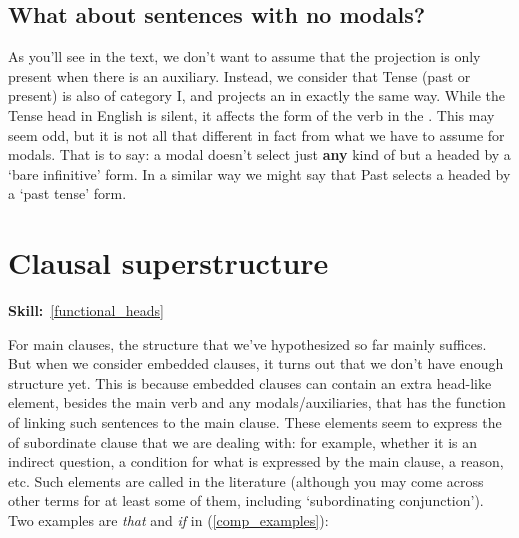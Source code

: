 \documentclass{article}
\begin{document}
\subsection{What about sentences with no modals?}

As you'll see in the text, we don't want to assume that the  projection is only present when there is an auxiliary. 
Instead, we consider that Tense (past or present) is also of category I, and projects an  in exactly the same way.
While the Tense head in English is silent, it affects the form of the verb in the .
This may seem odd, but it is not all that different in fact from what we have to assume for modals.
That is to say: a modal doesn't select just \textbf{any} kind of  but a  headed by a `bare infinitive' form.
In a similar way we might say that Past selects a  headed by a `past tense' form.  


\section{Clausal superstructure}
\hfill{}\textbf{Skill:}~\ref{functional_heads}

For main clauses, the structure that we've hypothesized so far mainly suffices.
But when we consider embedded clauses, it turns out that we don't have enough structure yet.
This is because embedded clauses can contain an extra head-like element, besides the main verb and any modals/auxiliaries, that has the function of linking such sentences to the main clause.
These elements seem to express the  of subordinate clause that we are dealing with: for example, whether it is an indirect question, a condition for what is expressed by the main clause, a reason, etc.
Such elements are called  in the literature (although you may come across other terms for at least some of them, including `subordinating conjunction'). 
Two examples are \emph{that}  and \emph{if} in (\ref{comp_examples}):
\begin{exe}
    \label{comp_examples}
\end{exe}
\end{document}
